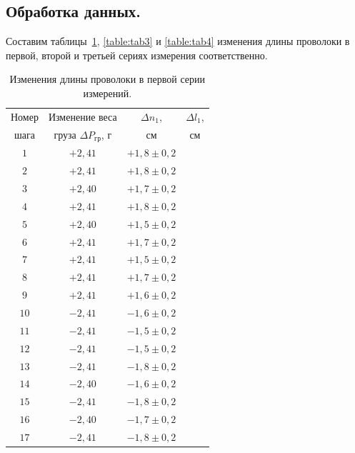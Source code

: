 \documentclass[a4paper,11pt]{article}
\begin{document}
\subsection{Обработка данных.}
Составим таблицы~\ref{table:tab2}, \ref{table:tab3} и \ref{table:tab4} изменения длины проволоки в первой, второй и третьей сериях измерения соответственно.
\begin{table}[h!]
\centering
\begin{tabular}{ ||c|c|c|c|| }
  \hline
  Номер & Изменение веса & $\Delta n_{1}$, & $\Delta l_{1}$, \\
  шага & груза $\Delta P_{гр}$, $г$ & $см$ & $см$ \\
  \hline
  $1$ & $+2,41$ & $+1,8 \pm 0,2$ & \\
  $2$ & $+2,41$ & $+1,8 \pm 0,2$ & \\
  $3$ & $+2,40$ & $+1,7 \pm 0,2$ & \\
  $4$ & $+2,41$ & $+1,8 \pm 0,2$ & \\
  $5$ & $+2,40$ & $+1,5 \pm 0,2$ & \\
  $6$ & $+2,41$ & $+1,7 \pm 0,2$ & \\
  $7$ & $+2,41$ & $+1,5 \pm 0,2$ & \\
  $8$ & $+2,41$ & $+1,7 \pm 0,2$ & \\
  $9$ & $+2,41$ & $+1,6 \pm 0,2$ & \\
  $10$ & $-2,41$ & $-1,6 \pm 0,2$ & \\
  $11$ & $-2,41$ & $-1,5 \pm 0,2$ & \\
  $12$ & $-2,41$ & $-1,5 \pm 0,2$ & \\
  $13$ & $-2,41$ & $-1,8 \pm 0,2$ & \\
  $14$ & $-2,40$ & $-1,6 \pm 0,2$ & \\
  $15$ & $-2,41$ & $-1,8 \pm 0,2$ & \\
  $16$ & $-2,40$ & $-1,7 \pm 0,2$ & \\
  $17$ & $-2,41$ & $-1,8 \pm 0,2$ & \\
  \hline
\end{tabular}
\caption{Изменения длины проволоки в первой серии измерений.}
\label{table:tab2}
\end{table}
\end{document}

